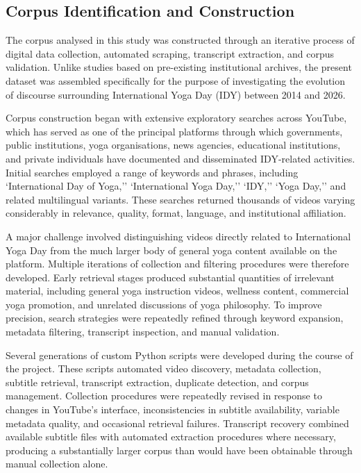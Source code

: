 \documentclass[11pt]{article}
\begin{document}
\subsection{Corpus Identification and Construction}



The corpus analysed in this study was constructed through an iterative process of digital data collection, automated
scraping, transcript extraction, and corpus validation. Unlike studies based on pre-existing institutional archives, the
present dataset was assembled specifically for the purpose of investigating the evolution of discourse surrounding
International Yoga Day (IDY) between 2014 and 2026.


Corpus construction began with extensive exploratory searches across YouTube, which has served as one of the principal
platforms through which governments, public institutions, yoga organisations, news agencies, educational institutions,
and private individuals have documented and disseminated IDY-related activities. Initial searches employed a range of
keywords and phrases, including `International Day of Yoga,'' `International Yoga Day,'' `IDY,'' `Yoga Day,'' and
related multilingual variants. These searches returned thousands of videos varying considerably in relevance, quality,
format, language, and institutional affiliation.


A major challenge involved distinguishing videos directly related to International Yoga Day from the much larger body of
general yoga content available on the platform. Multiple iterations of collection and filtering procedures were
therefore developed. Early retrieval stages produced substantial quantities of irrelevant material, including general
yoga instruction videos, wellness content, commercial yoga promotion, and unrelated discussions of yoga philosophy. To
improve precision, search strategies were repeatedly refined through keyword expansion, metadata filtering, transcript
inspection, and manual validation.


Several generations of custom Python scripts were developed during the course of the project. These scripts automated
video discovery, metadata collection, subtitle retrieval, transcript extraction, duplicate detection, and corpus
management. Collection procedures were repeatedly revised in response to changes in YouTube's interface, inconsistencies
in subtitle availability, variable metadata quality, and occasional retrieval failures. Transcript recovery combined
available subtitle files with automated extraction procedures where necessary, producing a substantially larger corpus
than would have been obtainable through manual collection alone.
\end{document}
